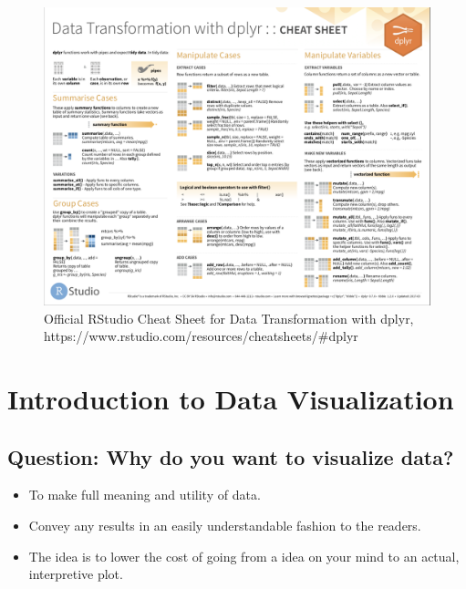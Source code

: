 \begin{figure}[ht]
  \begin{center}
    \includegraphics[width=1\textwidth]{figures/data_operations.png}
    \caption{Official RStudio Cheat Sheet for Data Transformation with 
    dplyr, https://www.rstudio.com/resources/cheatsheets/#dplyr}
    \label{fig:example_figure}
  \end{center}
\end{figure}

\section{Introduction to Data Visualization}
\subsection{Question: Why do you want to visualize data?}
\begin{itemize}
    \item To make full meaning and utility of data.
    \item Convey any results in an easily understandable fashion to the readers.
    \item The idea is to lower the cost of going from a idea on your mind to an actual, interpretive plot.
\end{itemize}
